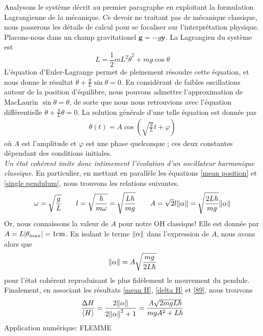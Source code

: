 \documentclass[11pt,oneside,a4paper]{article}
\newcommand{\h}{\ensuremath{\hbar}}
\begin{document}
Analysons le système décrit au premier paragraphe en exploitant la formulation Lagrangienne de la mécanique. Ce devoir ne traitant pas de mécanique classique, nous passerons les détails de calcul pour se focaliser sur l'interprétation physique. Placons-nous dans un champ gravitationel $\bm{g} = -g\bm{\bm{y}}$. La Lagrangien du système est 
\begin{equation}
  L = \frac{1}{2}mL^2\dot{\theta}^2 + mg\cos\theta 
\end{equation}
L'équation d'Euler-Lagrange permet de pleinement résoudre cette équation, et nous donne le résultat $\ddot{\theta} + \frac{g}{L}\sin\theta =  0$. En considérant de faibles oscillations autour de la position d'équilibre, nous pouvons admettre l'approximation de MacLaurin $\sin\theta=\theta$, de sorte que nous nous retrouvions avec l'équation différentielle $\ddot{\theta} + \frac{g}{L}\theta = 0$. La solution générale d'une telle équation est donnée par
\begin{align}
  \label{single pendulum}
  \theta(t) = A\cos(\sqrt{\frac{g}{L}}t+\varphi)
\end{align}
où $A$ est l'amplitude et $\varphi$ est une phase quelconque ; ces deux constantes dépendant des conditions initiales.\\

\emph{Un état cohérent imite donc intimement l'évolution d'un oscillateur harmonique classique.} En particulier, en mettant en parallèle les équations \eqref{mean position} et \eqref{single pendulum}, nous trouvons les relations suivantes.
\begin{equation}
  \omega = \sqrt{\frac{g}{L}}\qquad
  l = \sqrt{\frac{\h}{m\omega}} = \sqrt{\frac{L\h}{mg}}\qquad
  A = \sqrt{2}l\norm{\alpha} = \sqrt{\frac{2L\h}{mg}}\norm{\alpha} \label{eq:46}
\end{equation}
Or, nous connaissons la valeur de $A$ pour notre OH classique! Elle est donnée par $A = L\absolutevalue{\theta_{max}} = 1\si{cm}$. En isolant le terme $\norm{\alpha}$ dans l'expression de $A$, nous avons alors que
\begin{equation}
  \label{89}
  \norm{\alpha}= A\sqrt{\frac{mg}{2L\h}}
\end{equation}
pour l'état cohérent reproduisant le plus fidèlement le mouvement du pendule.\\

Finalement, en associant les résultats \eqref{mean H}, \eqref{delta H} et \eqref{89}, nous trouvons
\begin{equation}
  \frac{\Delta H}{\expval{H}} = \frac{2\norm{\alpha}}{2\norm{\alpha}^2+1} = \frac{A\sqrt{2mgL\h}}{mgA^2+L\h}
\end{equation}
Application numérique: FLEMME
\end{document}
